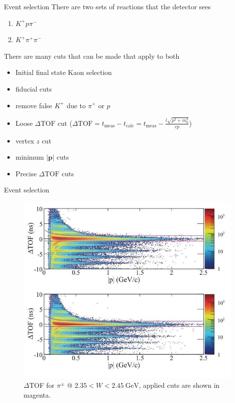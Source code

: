 \documentclass[11pt,aspectratio=1610,dvipsnames]{beamer}
\begin{document}
\begin{frame}{Event selection}
	There are two sets of reactions that the detector sees
	
	\begin{enumerate}
		\item $K^+p\pi^-$
		\item $K^+\pi^+\pi^-$
	\end{enumerate}
There are many cuts that can be made that apply to both
	\begin{tcolorbox}[colback=black!10,colframe=gray!20!black,title=Initial selection of particles] 
		\begin{itemize}
			\item Initial final state Kaon selection
			\item fiducial cuts
			\item remove false $K^+$ due to $\pi^+$ or $p$
			\item Loose $\Delta\text{TOF}$ cut ($\Delta\text{TOF}=t_\text{meas}-t_\text{calc}=t_\text{meas}-\frac{l\sqrt{p^2+m_0^2}}{cp}$)
			\item vertex $z$ cut
			\item minimum $|\mathbf{p}|$ cuts
			\item Precise $\Delta\text{TOF}$ cuts
			
		\end{itemize}
	\end{tcolorbox}
\end{frame}
\begin{frame}{Event selection}
\begin{figure}
	\centering
	\includegraphics[width=.55\linewidth]{tof}
	\caption{$\Delta$TOF for $\pi^\pm$ @ $2.35 < W < \SI{2.45}{\giga\eV}$, applied cuts are shown in magenta. \citet{lineshapes}}
\end{figure}
\end{frame}
\end{document}
